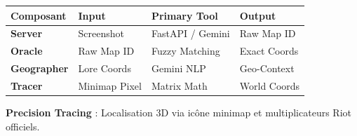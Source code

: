 \documentclass[11pt,a4paper]{article}
\begin{document}
\begin{center}
\small
\begin{tabular}{@{}llll@{}}
\toprule
\textbf{Composant} & \textbf{Input} & \textbf{Primary Tool} & \textbf{Output} \\ \midrule
\textbf{Server}    & Screenshot     & FastAPI / Gemini      & Raw Map ID      \\
\textbf{Oracle}     & Raw Map ID     & Fuzzy Matching        & Exact Coords    \\
\textbf{Geographer}  & Lore Coords    & Gemini NLP            & Geo-Context     \\
\textbf{Tracer}    & Minimap Pixel  & Matrix Math           & World Coords \\ \bottomrule
\end{tabular}
\end{center}

\begin{tcolorbox}[colback=tacticalcyan!5,colframe=tacticalcyan!80,title=\sffamily\bfseries TIP : Precision Tracing]
\small
\textbf{Precision Tracing} : Localisation 3D via icône minimap et multiplicateurs Riot officiels.
\end{tcolorbox}
\end{document}
